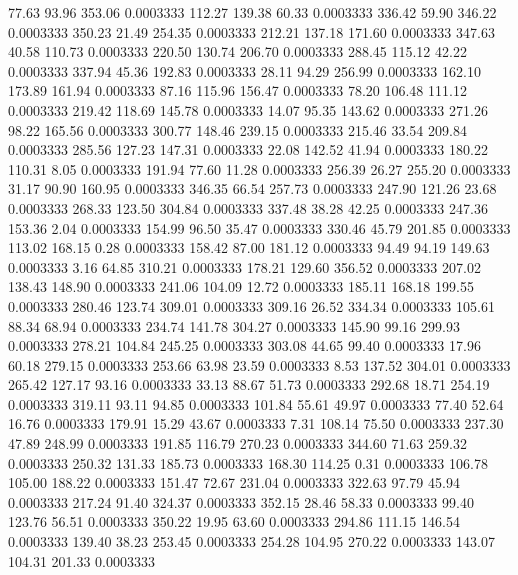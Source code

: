   77.63   93.96  353.06   0.0003333
 112.27  139.38   60.33   0.0003333
 336.42   59.90  346.22   0.0003333
 350.23   21.49  254.35   0.0003333
 212.21  137.18  171.60   0.0003333
 347.63   40.58  110.73   0.0003333
 220.50  130.74  206.70   0.0003333
 288.45  115.12   42.22   0.0003333
 337.94   45.36  192.83   0.0003333
  28.11   94.29  256.99   0.0003333
 162.10  173.89  161.94   0.0003333
  87.16  115.96  156.47   0.0003333
  78.20  106.48  111.12   0.0003333
 219.42  118.69  145.78   0.0003333
  14.07   95.35  143.62   0.0003333
 271.26   98.22  165.56   0.0003333
 300.77  148.46  239.15   0.0003333
 215.46   33.54  209.84   0.0003333
 285.56  127.23  147.31   0.0003333
  22.08  142.52   41.94   0.0003333
 180.22  110.31    8.05   0.0003333
 191.94   77.60   11.28   0.0003333
 256.39   26.27  255.20   0.0003333
  31.17   90.90  160.95   0.0003333
 346.35   66.54  257.73   0.0003333
 247.90  121.26   23.68   0.0003333
 268.33  123.50  304.84   0.0003333
 337.48   38.28   42.25   0.0003333
 247.36  153.36    2.04   0.0003333
 154.99   96.50   35.47   0.0003333
 330.46   45.79  201.85   0.0003333
 113.02  168.15    0.28   0.0003333
 158.42   87.00  181.12   0.0003333
  94.49   94.19  149.63   0.0003333
   3.16   64.85  310.21   0.0003333
 178.21  129.60  356.52   0.0003333
 207.02  138.43  148.90   0.0003333
 241.06  104.09   12.72   0.0003333
 185.11  168.18  199.55   0.0003333
 280.46  123.74  309.01   0.0003333
 309.16   26.52  334.34   0.0003333
 105.61   88.34   68.94   0.0003333
 234.74  141.78  304.27   0.0003333
 145.90   99.16  299.93   0.0003333
 278.21  104.84  245.25   0.0003333
 303.08   44.65   99.40   0.0003333
  17.96   60.18  279.15   0.0003333
 253.66   63.98   23.59   0.0003333
   8.53  137.52  304.01   0.0003333
 265.42  127.17   93.16   0.0003333
  33.13   88.67   51.73   0.0003333
 292.68   18.71  254.19   0.0003333
 319.11   93.11   94.85   0.0003333
 101.84   55.61   49.97   0.0003333
  77.40   52.64   16.76   0.0003333
 179.91   15.29   43.67   0.0003333
   7.31  108.14   75.50   0.0003333
 237.30   47.89  248.99   0.0003333
 191.85  116.79  270.23   0.0003333
 344.60   71.63  259.32   0.0003333
 250.32  131.33  185.73   0.0003333
 168.30  114.25    0.31   0.0003333
 106.78  105.00  188.22   0.0003333
 151.47   72.67  231.04   0.0003333
 322.63   97.79   45.94   0.0003333
 217.24   91.40  324.37   0.0003333
 352.15   28.46   58.33   0.0003333
  99.40  123.76   56.51   0.0003333
 350.22   19.95   63.60   0.0003333
 294.86  111.15  146.54   0.0003333
 139.40   38.23  253.45   0.0003333
 254.28  104.95  270.22   0.0003333
 143.07  104.31  201.33   0.0003333
